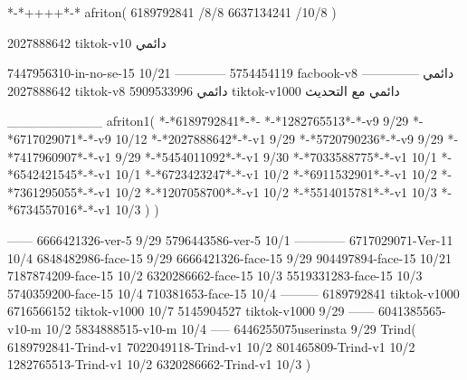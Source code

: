 *-*++++*-*
afriton(
6189792841 /8/8
6637134241 /10/8
)

2027888642 tiktok-v10
دائمي


7447956310-in-no-se-15 10/21
------------
5754454119 facbook-v8
دائمي
--------------
2027888642 tiktok-v8
دائمي
5909533996 tiktok-v1000
دائمي مع التحديث

__________
afriton1(
*-*6189792841*-*-
*-*1282765513*-*-v9 9/29
*-*6717029071*-*-v9 10/12
*-*2027888642*-*-v1 9/29
*-*5720790236*-*-v9 9/29
*-*7417960907*-*-v1 9/29
*-*5454011092*-*-v1 9/30
*-*7033588775*-*-v1 10/1
*-*6542421545*-*-v1 10/1
*-*6723423247*-*-v1 10/2
*-*6911532901*-*-v1 10/2
*-*7361295055*-*-v1 10/2
*-*1207058700*-*-v1 10/2
*-*5514015781*-*-v1 10/3
*-*6734557016*-*-v1 10/3
)
)

------
6666421326-ver-5 9/29
5796443586-ver-5 10/1
------------
6717029071-Ver-11
10/4
6848482986-face-15 9/29
6666421326-face-15 9/29
904497894-face-15 10/21
7187874209-face-15 10/2
6320286662-face-15 10/3
5519331283-face-15 10/3
5740359200-face-15 10/4
710381653-face-15 10/4
---------
6189792841 tiktok-v1000
6716566152 tiktok-v1000
10/7
5145904527 tiktok-v1000
9/29
------
6041385565-v10-m 10/2
5834888515-v10-m 10/4
-----
6446255075userinsta 9/29
Trind(
6189792841-Trind-v1 
7022049118-Trind-v1 10/2
801465809-Trind-v1 10/2
1282765513-Trind-v1 10/2
6320286662-Trind-v1 10/3
)
